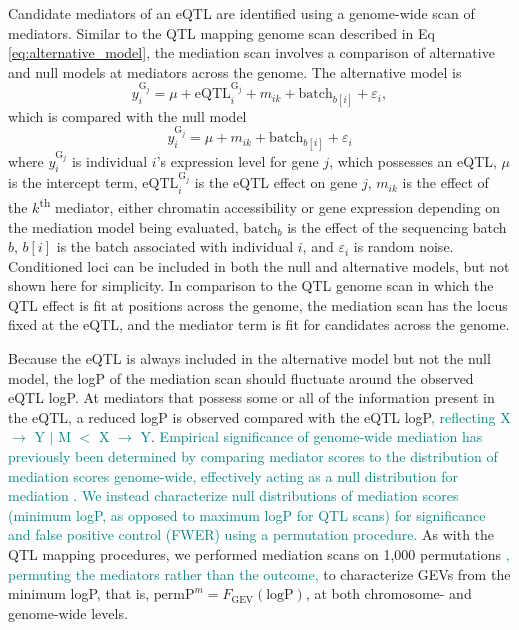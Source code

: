 \documentclass[10pt,letterpaper]{article}
\newcommand{\permpmed}{\text{permP}^{m}}
\newcommand{\GKinline}[1]{\textcolor{teal}{#1}}
\begin{document}
Candidate mediators of an eQTL are identified using a genome-wide scan of mediators. 
Similar to the QTL mapping genome scan described in Eq \ref{eq:alternative_model}, the mediation scan involves a comparison of alternative and null models at mediators across the genome. The alternative model is
\begin{equation}
y^{\text{G}_{j}}_{i} = \mu + \text{eQTL}_{i}^{\text{G}_{j}} + m_{ik} + \text{batch}_{b[i]} + \varepsilon_{i},
\label{eq:mediation_alt}
\end{equation}
which is compared with the null model
\begin{equation}
y^{\text{G}_{j}}_{i} = \mu + m_{ik} \nonumber + \text{batch}_{b[i]} + \varepsilon_{i}
\label{eq:mediation_null}
\end{equation}
where $y^{\text{G}_{j}}_{i}$ is individual $i$'s expression level for gene $j$, which possesses an eQTL, $\mu$ is the intercept term, $\text{eQTL}_{i}^{\text{G}_{j}}$ is the eQTL effect on gene $j$, $m_{ik}$ is the effect of the $k$\textsuperscript{th} mediator, either chromatin accessibility or gene expression depending on the mediation model being evaluated, $\text{batch}_{b}$ is the effect of the sequencing batch $b$, $b[i]$ is the batch associated with individual $i$, and $\varepsilon_{i}$ is random noise. Conditioned loci can be included in both the null and alternative models, but not shown here for simplicity. In comparison to the QTL genome scan in which the QTL effect is fit at positions across the genome, the mediation scan has the locus fixed at the eQTL, and the mediator term is fit for candidates across the genome.

Because the eQTL is always included in the alternative model but not the null model, the logP of the mediation scan should fluctuate around the observed eQTL logP. At mediators that possess some or all of the information present in the eQTL, a reduced logP is observed compared with the eQTL logP\GKinline{, reflecting X $\rightarrow$ Y $|$ M $<$ X $\rightarrow$ Y}. 
\GKinline{Empirical significance of genome-wide mediation has previously been determined by comparing mediator scores to the distribution of mediation scores genome-wide, effectively acting as a null distribution for mediation \cite{Chick2016,Keller2018,Skelly2019}. We instead characterize null distributions of mediation scores (minimum logP, as opposed to maximum logP for QTL scans) for significance and false positive control (FWER) using a permutation procedure.} 
As with the QTL mapping procedures, we performed mediation scans on 1,000 permutations
\GKinline{, permuting the mediators rather than the outcome,} to characterize GEVs from the minimum logP, that is, $\permpmed = F_{\text{GEV}}(\text{logP})$, at both chromosome- and genome-wide levels. 
\end{document}
